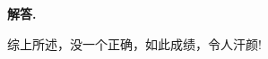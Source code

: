 \documentclass[12pt, a4paper, oneside]{ctexart}
\newenvironment{solution}{\par\noindent\textbf{解答. }}{\par}
\begin{document}
\begin{solution}
\par
\quad
\par
综上所述，没一个正确，如此成绩，令人汗颜! 














\end{solution}
  
\end{document}

